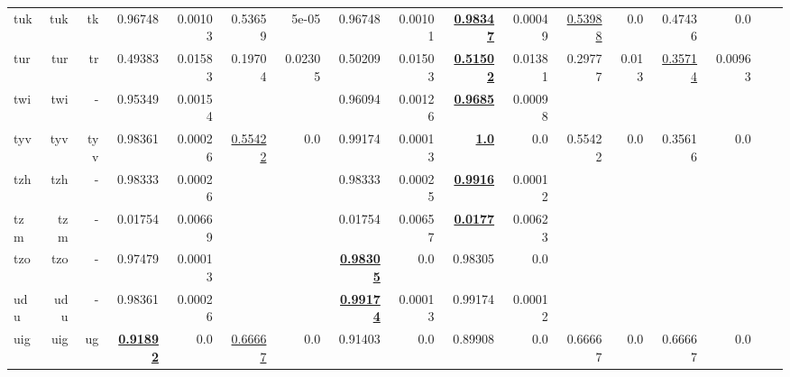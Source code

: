 \documentclass[11pt]{article}
\begin{document}
\begin{table*}[h]
{\begin{tabular}{lrrrrrrrrrrrrrrrr}
tuk         & tuk         & tk         & 0.96748         & 0.00103         & 0.53659         & 5e-05         & 0.96748         & 0.00101         & \textbf{\underline{0.98347}}         & 0.00049         & \underline{0.53988}         & 0.0         & 0.47436         & 0.0         \\
tur         & tur         & tr         & 0.49383         & 0.01583         & 0.19704         & 0.02305         & 0.50209         & 0.01503         & \textbf{\underline{0.51502}}         & 0.01381         & 0.29777         & 0.013         & \underline{0.35714}         & 0.00963         \\
twi         & twi         & -         & 0.95349         & 0.00154         &          &          & 0.96094         & 0.00126         & \textbf{\underline{0.9685}}         & 0.00098         &          &          &          &          \\
tyv         & tyv         & tyv         & 0.98361         & 0.00026         & \underline{0.55422}         & 0.0         & 0.99174         & 0.00013         & \textbf{\underline{1.0}}         & 0.0         & 0.55422         & 0.0         & 0.35616         & 0.0         \\
tzh         & tzh         & -         & 0.98333         & 0.00026         &          &          & 0.98333         & 0.00025         & \textbf{\underline{0.9916}}         & 0.00012         &          &          &          &          \\
tzm         & tzm         & -         & 0.01754         & 0.00669         &          &          & 0.01754         & 0.00657         & \textbf{\underline{0.0177}}         & 0.00623         &          &          &          &          \\
tzo         & tzo         & -         & 0.97479         & 0.00013         &          &          & \textbf{\underline{0.98305}}         & 0.0         & 0.98305         & 0.0         &          &          &          &          \\
udu         & udu         & -         & 0.98361         & 0.00026         &          &          & \textbf{\underline{0.99174}}         & 0.00013         & 0.99174         & 0.00012         &          &          &          &          \\
uig         & uig         & ug         & \textbf{\underline{0.91892}}         & 0.0         & \underline{0.66667}         & 0.0         & 0.91403         & 0.0         & 0.89908         & 0.0         & 0.66667         & 0.0         & 0.66667         & 0.0         \\

\end{tabular}}
\end{table*}
\end{document}
